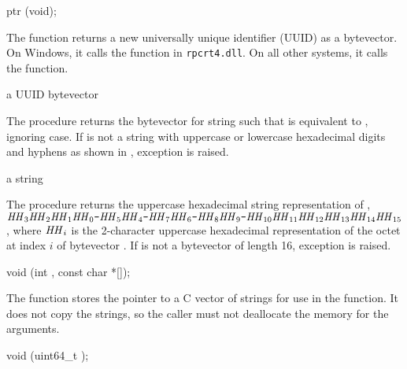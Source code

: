 \begin{function}
  ptr (void);
\end{function}

The  function returns a new universally unique
identifier (UUID) as a bytevector. On Windows, it calls the
 function in \texttt{rpcrt4.dll}. On all other
systems, it calls the  function.

\begin{procedure}
\end{procedure}
\returns{} a UUID bytevector

The  procedure returns the bytevector 
for string  such that  is
equivalent to , ignoring case. If  is not a string with
uppercase or lowercase hexadecimal digits and hyphens as shown in
, exception 
is raised.

\begin{procedure}
\end{procedure}
\returns{} a string

The  procedure returns the uppercase hexadecimal
string representation of ,
$\var{HH}_3\var{HH}_2\var{HH}_1\var{HH}_0\code{-}\var{HH}_5\var{HH}_4\code{-}\var{HH}_7\var{HH}_6\code{-}\var{HH}_8\var{HH}_9\code{-}\var{HH}_{10}\var{HH}_{11}\var{HH}_{12}\var{HH}_{13}\var{HH}_{14}\var{HH}_{15}$,
where $\var{HH}_i$ is the 2-character uppercase hexadecimal
representation of the octet at index $i$ of bytevector .  If
 is not a bytevector of length 16, exception
 is raised.

\begin{function}
  void (int , const char *[]);
\end{function}

The  function stores the  pointer to a
C vector of  strings for use in the 
function. It does not copy the strings, so the caller must not
deallocate the memory for the arguments.

\begin{function}
  void (uint64\_t );
\end{function}

